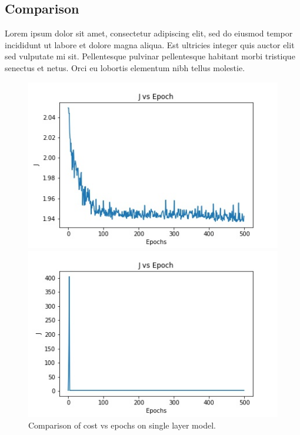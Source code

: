 \documentclass{cup-ino}
\begin{document}
\subsection{Comparison}
Lorem ipsum dolor sit amet, consectetur adipiscing elit, sed do eiusmod tempor incididunt ut labore et dolore magna aliqua. Est ultricies integer quis auctor elit sed vulputate mi sit. Pellentesque pulvinar pellentesque habitant morbi tristique senectus et netus. Orci eu lobortis elementum nibh tellus molestie.

\begin{figure}[h!]
\begin{minipage}{0.47\textwidth}
\includegraphics[width=\linewidth]{images/single_gen_cost.jpeg}
\end{minipage}
\hfill
\begin{minipage}{0.47\textwidth}
\includegraphics[width=\linewidth]{images/single_grad_cost.jpeg}
\end{minipage}

\caption{Comparison of cost vs epochs on single layer model.}
\label{fig:singlecost}
\end{figure}
\end{document}
